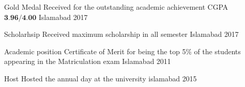 

\begin{cvhonors}

   \cvhonor
{Gold Medal}
   {Received for the outstanding academic achievement CGPA $\textbf{3.96/4.00}$ } %
   {Islamabad} %
   {2017} %



   \cvhonor
   {Scholarhsip} %
   {Received maximum scholarship in all semester } %
   {Islamabad} %
   {2017} %
 
  \cvhonor
    {Academic position} %
    {Certificate of Merit for being the top 5\% of the students appearing in the Matriculation exam} %
    {Islamabad} %
    {2011} %

  \cvhonor
    {Host } %
    {Hosted the annual day at the university} %
    {islamabad} %
    {2015} %
 
\end{cvhonors}
